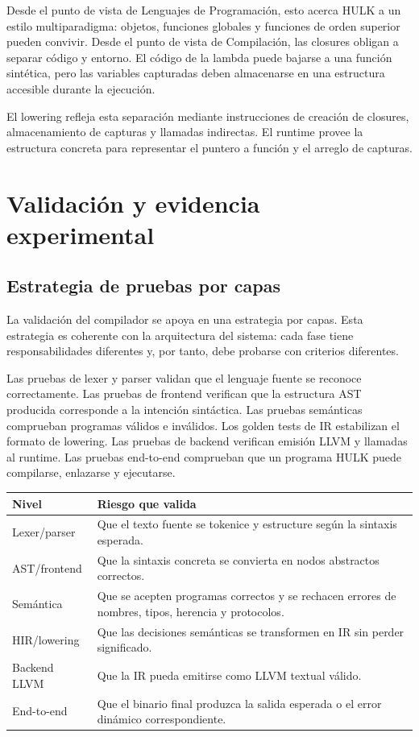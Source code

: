 \documentclass[12pt,letterpaper]{article}
\newcommand{\hulk}{\textsc{HULK}}
\begin{document}
Desde el punto de vista de Lenguajes de Programación, esto acerca \hulk{} a un estilo multiparadigma: objetos, funciones globales y funciones de orden superior pueden convivir. Desde el punto de vista de Compilación, las closures obligan a separar código y entorno. El código de la lambda puede bajarse a una función sintética, pero las variables capturadas deben almacenarse en una estructura accesible durante la ejecución.

El lowering refleja esta separación mediante instrucciones de creación de closures, almacenamiento de capturas y llamadas indirectas. El runtime provee la estructura concreta para representar el puntero a función y el arreglo de capturas.


\section{Validación y evidencia experimental}

\subsection{Estrategia de pruebas por capas}

La validación del compilador se apoya en una estrategia por capas. Esta estrategia es coherente con la arquitectura del sistema: cada fase tiene responsabilidades diferentes y, por tanto, debe probarse con criterios diferentes.

Las pruebas de lexer y parser validan que el lenguaje fuente se reconoce correctamente. Las pruebas de frontend verifican que la estructura AST producida corresponde a la intención sintáctica. Las pruebas semánticas comprueban programas válidos e inválidos. Los golden tests de IR estabilizan el formato de lowering. Las pruebas de backend verifican emisión LLVM y llamadas al runtime. Las pruebas end-to-end comprueban que un programa \hulk{} puede compilarse, enlazarse y ejecutarse.

\begin{center}
\small
\begin{tabularx}{\textwidth}{p{3.4cm}X}
\toprule
\textbf{Nivel} & \textbf{Riesgo que valida} \\
\midrule
Lexer/parser & Que el texto fuente se tokenice y estructure según la sintaxis esperada. \\
AST/frontend & Que la sintaxis concreta se convierta en nodos abstractos correctos. \\
Semántica & Que se acepten programas correctos y se rechacen errores de nombres, tipos, herencia y protocolos. \\
HIR/lowering & Que las decisiones semánticas se transformen en IR sin perder significado. \\
Backend LLVM & Que la IR pueda emitirse como LLVM textual válido. \\
End-to-end & Que el binario final produzca la salida esperada o el error dinámico correspondiente. \\
\bottomrule
\end{tabularx}
\end{center}
\end{document}

